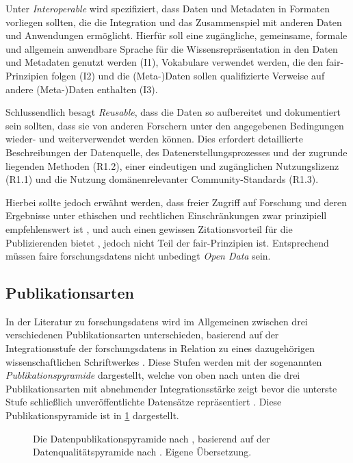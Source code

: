 Unter \textit{Interoperable} wird spezifiziert, dass Daten und Metadaten in Formaten vorliegen sollten, die die Integration und das Zusammenspiel mit anderen Daten und Anwendungen ermöglicht.
Hierfür soll eine zugängliche, gemeinsame, formale und allgemein anwendbare Sprache für die Wissensrepräsentation in den Daten und Metadaten genutzt werden (I1), Vokabulare verwendet werden, die den \gls{fair}-Prinzipien folgen (I2) und die (Meta-)Daten sollen qualifizierte Verweise auf andere (Meta-)Daten enthalten (I3).

Schlussendlich besagt \textit{Reusable}, dass die Daten so aufbereitet und dokumentiert sein sollten, dass sie von anderen Forschern unter den angegebenen Bedingungen wieder- und weiterverwendet werden können.
Dies erfordert detaillierte Beschreibungen der Datenquelle, des Datenerstellungsprozesses und der zugrunde liegenden Methoden (R1.2), einer eindeutigen und zugänglichen Nutzungslizenz (R1.1) und die Nutzung domänenrelevanter Community-Standards (R1.3).

Hierbei sollte jedoch erwähnt werden, dass freier Zugriff auf Forschung und deren Ergebnisse unter ethischen und rechtlichen Einschränkungen zwar prinzipiell empfehlenswert ist \autocite{Hopf2022}, und auch einen gewissen Zitationsvorteil für die Publizierenden bietet \autocite{Piwowar2013-DataReuse,Bautista-Puig2020}, jedoch nicht Teil der \gls{fair}-Prinzipien ist.
Entsprechend müssen \gls{fair}e \glspl{forschungsdaten} nicht unbedingt \textit{Open Data} sein.

\subsection{Publikationsarten}\label{sec:forschungsstand-basics-publicationtypes}
In der Literatur zu \glspl{forschungsdaten} wird im Allgemeinen zwischen drei verschiedenen Publikationsarten unterschieden, basierend auf der Integrationsstufe der \glspl{forschungsdaten} in Relation zu eines dazugehörigen wissenschaftlichen Schriftwerkes \autocite{ReillyEtAl2011}.
Diese Stufen werden mit der sogenannten \textit{Publikationspyramide} dargestellt, welche von oben nach unten die drei Publikationsarten mit abnehmender Integrationsstärke zeigt bevor die unterste Stufe schließlich unveröffentlichte Datensätze repräsentiert \autocite{ReillyEtAl2011}.
Diese Publikationspyramide ist in \cref{fig:data-pyramid} dargestellt.
\begin{figure}[!htbp]
    \centering
    \resizebox{.8\textwidth}{!}{}
    \caption{Die Datenpublikationspyramide nach \citeauthor{ReillyEtAl2011} \autocite{ReillyEtAl2011}, basierend auf der Datenqualitätspyramide nach \citeauthor{Gray2009} \autocite{Gray2009}.
    Eigene Übersetzung.}
    \label{fig:data-pyramid}
\end{figure}

